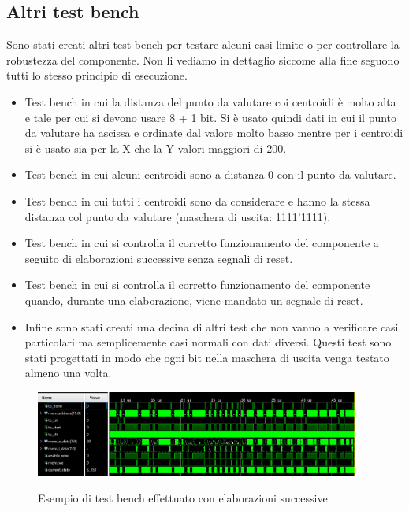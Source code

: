 \documentclass{article}
\begin{document}
\subsection{Altri test bench}
Sono stati creati altri test bench per testare alcuni casi limite o per controllare la robustezza del componente. Non li vediamo in dettaglio siccome alla fine seguono tutti lo stesso principio di esecuzione.
\begin{itemize}
    \item Test bench in cui la distanza del punto da valutare coi centroidi è molto alta e tale per cui si devono usare 8 + 1 bit. Si è usato quindi dati in cui il punto da valutare ha ascissa e ordinate dal valore molto basso mentre per i centroidi si è usato sia per la X che la Y valori maggiori di 200.
    \item Test bench in cui alcuni centroidi sono a distanza 0 con il punto da valutare.
    \item Test bench in cui tutti i centroidi sono da considerare e hanno la stessa distanza col punto da valutare (maschera di uscita: 1111'1111).
    \item Test bench in cui si controlla il corretto funzionamento del componente a seguito di elaborazioni successive senza segnali di reset.
    \item Test bench in cui si controlla il corretto funzionamento del componente quando, durante una elaborazione, viene mandato un segnale di reset.
    \item Infine sono stati creati una decina di altri test che non vanno a verificare casi particolari ma semplicemente casi normali con dati diversi. Questi test sono stati progettati in modo che ogni bit nella maschera di uscita venga testato almeno una volta.
\end{itemize}
\begin{figure}[H]
    \centering
    \caption{Esempio di test bench effettuato con elaborazioni successive}
    \includegraphics[width=0.95\textwidth]{images/altri-test-bench.png}
    \label{fig:altri-test-bench}
\end{figure}


\pagebreak
\end{document}
